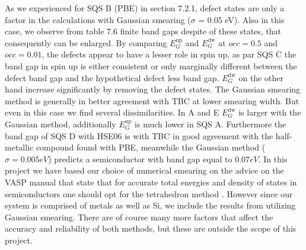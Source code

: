 As we experienced for SQS B (PBE) in section 7.2.1, defect states are only a factor in the calculations with Gaussian smearing ($\sigma$ = 0.05 eV). Also in this case, we observe from table 7.6 finite band gaps despite of these states, that consequently can be enlarged. By comparing $E_G ^\text{up}$ and $E_G ^\text{dw}$ at $occ = 0.5$ and $occ = 0.01$, the defects appear to have a lesser role in spin up, as par SQS C the band gap in spin up is either consistent or only marginally different between the defect band gap and the hypothetical defect less band gap. $E_G ^\text{dw}$ on the other hand increase significantly by removing the defect states. The Gaussian smearing method is generally in better agreement with TBC at lower smearing width. But even in this case we find several dissimilarities. In A and E $E_G ^\text{dw}$ is larger with the Gaussian method, additionally $E_G ^\text{up}$ is much lower in SQS A. Furthermore the band gap of SQS D with HSE06 is with TBC in good agreement with the half-metallic compound found with PBE, meanwhile the Gaussian method ($\sigma = 0.005 eV$) predicts a semiconductor with band gap equal to $0.07 eV$. In this project we have based our choice of numerical smearing on the advice on the VASP manual that state that for accurate total energies and density of states in semiconductors one should opt for the tetrahedron method \cite{ismear}.  However since our system is comprised of metals as well as Si, we include the results from utilizing Gaussian smearing. There are of course many more factors that affect the accuracy and reliability of both methods, but these are outside the scope of this project.

